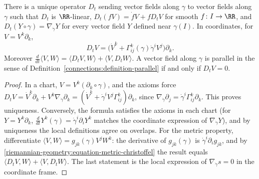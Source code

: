 \begin{proposition}\label{riemannian-geometry:proposition-covariant-derivative-curves}
There is a unique operator $D_t$ sending vector fields along $\gamma$ to vector fields along $\gamma$ such that $D_t$ is $\RR$-linear, $D_t(fV) = \dot fV + fD_tV$ for smooth $f \colon I \to \RR$, and
$D_t(Y \circ \gamma) = \nabla_{\dot\gamma}Y$ for every vector field $Y$ defined near $\gamma(I)$. In coordinates, for $V = V^k\partial_k$,
\[
D_tV = \big(\dot V^k + \Gamma^k_{ij}(\gamma)\dot\gamma^iV^j\big)\partial_k.
\]
Moreover $\frac{d}{dt}\langle V, W\rangle = \langle D_tV, W\rangle + \langle V, D_tW\rangle$. A vector field along $\gamma$ is parallel in the sense of Definition~\ref{connections:definition-parallel} if and only if $D_tV = 0$.
\end{proposition}

\begin{proof}
In a chart, $V = V^k(\partial_k \circ \gamma)$, and the axioms force $D_tV = \dot V^k\partial_k + V^k\nabla_{\dot\gamma}\partial_k = (\dot V^k + \dot\gamma^iV^j\Gamma^k_{ij})\partial_k$, since $\nabla_{\dot\gamma}\partial_j = \dot\gamma^i\Gamma^k_{ij}\partial_k$. This
proves uniqueness. Conversely, the formula satisfies the axioms in each chart (for $Y = Y^k\partial_k$, $\frac{d}{dt}Y^k(\gamma) = \dot\gamma^i\partial_iY^k$ matches the coordinate expression of $\nabla_{\dot\gamma}Y$), and by uniqueness the
local definitions agree on overlaps. For the metric property, differentiate $\langle V, W\rangle = g_{jk}(\gamma)V^jW^k$: the derivative of $g_{jk}(\gamma)$ is $\dot\gamma^i\partial_ig_{jk}$, and by \eqref{riemannian-geometry:equation-metric-christoffel} the result equals
$\langle D_tV, W\rangle + \langle V, D_tW\rangle$. The last statement is the local expression of $\nabla_{\dot\gamma}s = 0$ in the coordinate frame.
\end{proof}

